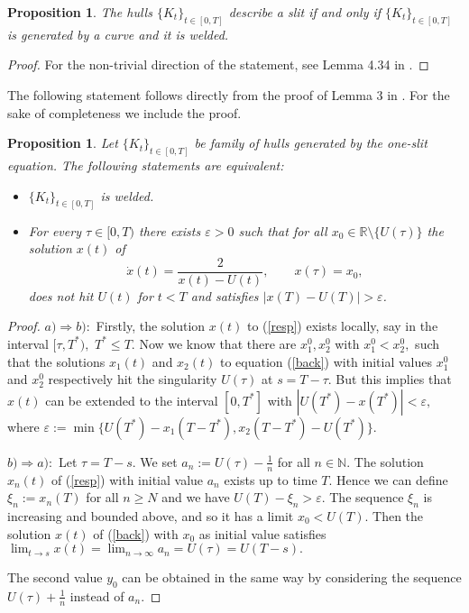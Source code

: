 \documentclass[11pt]{amsart}
\numberwithin{equation}{section}
\theoremstyle{plain}
\newtheorem{proposition}[theorem]{Proposition}
\theoremstyle{definition}
\begin{document}
\begin{proposition} 
The hulls $\{K_t\}_{t\in[0,T]}$ describe a slit if and only if $\{K_t\}_{t\in[0,T]}$ is generated by a curve and it is welded.
\end{proposition}
\begin{proof}
For the non-trivial direction of the statement, see Lemma 4.34 in \cite{Lawler:2005}.
\end{proof}

The following statement follows directly from the proof of Lemma 3 in \cite{Lind:2005}. For the sake of completeness we include the proof.

\begin{proposition}\label{Fritz} Let $\{K_t\}_{t\in[0,T]}$ be family of hulls generated by the one-slit equation. The following statements are equivalent:
\begin{itemize}
 \item[a)] $\{K_t\}_{t\in[0,T]}$ is welded.
\item[b)] For every $\tau\in[0,T)$ there exists ${\varepsilon}>0$ such that for all $x_0\in{\mathbb R}\setminus\{U(\tau)\}$ the solution $x(t)$ of 
\begin{equation}\label{resp} \dot{x}(t)=\frac{2}{x(t)-U(t)}, \qquad x(\tau)=x_0, \end{equation} does not hit $U(t)$ for $t<T$ and satisfies $|x(T)-U(T)|>{\varepsilon}$. 
\end{itemize}
\end{proposition}
\begin{proof}
$a)\Longrightarrow b):$ Firstly, the solution $x(t)$ to (\ref{resp}) exists locally, say in the interval $[\tau, T^*),$ $T^*\leq T.$ 
Now we know that there are $x_1^0,x_2^0$ with $x_1^0<x_2^0,$ such that the solutions $x_1(t)$ and $x_2(t)$ to equation (\ref{back}) with initial values $x_1^0$ and $x_2^0$ respectively hit the singularity $U(\tau)$ at $s=T-\tau$. But this implies that $x(t)$ can be extended to the interval $[0,T^*]$ with $|U(T^*)-x(T^*)|<{\varepsilon},$ where ${\varepsilon}:=\min\{U(T^*)-x_1(T-T^*),x_2(T-T^*)-U(T^*)\}.$

$b)\Longrightarrow a):$ Let $\tau=T-s.$ We set $a_n:=U(\tau)-\frac{1}{n}$ for all $n\in{\mathbb N}.$ The solution $x_n(t)$ of (\ref{resp}) with initial value $a_n$ exists up to time $T$. Hence we can define $\xi_n:=x_n(T)$ for all $n\geq N$ and we have $U(T)-\xi_n>{\varepsilon}.$ The sequence $\xi_n$ is increasing and bounded above, and so it has a limit $x_0<U(T).$ Then the solution $x(t)$ of (\ref{back}) with $x_0$ as initial value satisfies $\displaystyle \lim_{t\to s}x(t)=\lim_{n\to\infty}a_n=U(\tau)=U(T-s).$

The second value $y_0$ can be obtained in the same way by considering the sequence $U(\tau)+\frac{1}{n}$ instead of $a_n.$
\end{proof}
\end{document}
